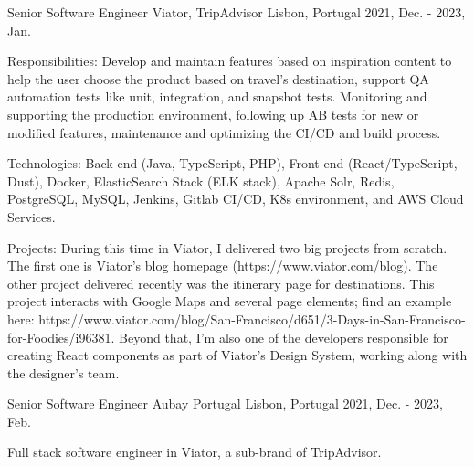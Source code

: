 \begin{cventries}
  \cventry
    {Senior Software Engineer} %
    {Viator, TripAdvisor} %
    {Lisbon, Portugal} %
    {2021, Dec. - 2023, Jan.} %
    {
          \begin{cvitems} %
            \item {Responsibilities: Develop and maintain features based on inspiration content to help the user choose the product based on travel's destination, support QA automation tests like unit, integration, and snapshot tests. Monitoring and supporting the production environment, following up AB tests for new or modified features, maintenance and optimizing the CI/CD and build process.}
            \item {Technologies: Back-end (Java, TypeScript, PHP), Front-end (React/TypeScript, Dust), Docker, ElasticSearch Stack (ELK stack), Apache Solr, Redis, PostgreSQL, MySQL, Jenkins, Gitlab CI/CD, K8s environment, and AWS Cloud Services.}
            \item {Projects: During this time in Viator, I delivered two big projects from scratch. The first one is Viator's blog homepage (https://www.viator.com/blog). The other project delivered recently was the itinerary page for destinations. This project interacts with Google Maps and several page elements; find an example here: https://www.viator.com/blog/San-Francisco/d651/3-Days-in-San-Francisco-for-Foodies/i96381. Beyond that, I'm also one of the developers responsible for creating React components as part of Viator's Design System, working along with the designer's team.}
          \end{cvitems}
    }

  \cventry
    {Senior Software Engineer} %
    {Aubay Portugal} %
    {Lisbon, Portugal} %
    {2021, Dec. - 2023, Feb.} %
    {
          \begin{cvitems} %
            \item {Full stack software engineer in Viator, a sub-brand of TripAdvisor.}
          \end{cvitems}
    }


\end{cventries}
